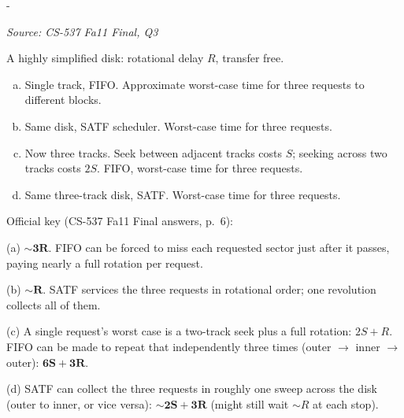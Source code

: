 \documentclass[11pt,a4paper]{article}
\makeatletter
\newcommand{\keepspace}[1]{\par\penalty-100\begingroup
  \setlength{\dimen@}{#1}\dimen@ii\pagegoal\advance\dimen@ii-\pagetotal
  \ifdim\dimen@>\dimen@ii\ifdim\dimen@ii>\z@\vfil\fi\break\fi\endgroup}
\newcounter{qn}[section]
\newenvironment{Qn}[4]{%
  \refstepcounter{qn}\keepspace{7\baselineskip}%
  \begin{tcolorbox}[qboxstyle, title={Q\thesection.\theqn\ \ [#1 \textbar\ #2]\ \ #4}]%
  {\footnotesize\color{g3}\textit{Source: #3}}\par\smallskip%
}{%
  \end{tcolorbox}%
}
\newenvironment{Sol}{%
  \begin{tcolorbox}[sboxstyle, title={Solution}]%
}{%
  \end{tcolorbox}\vspace{0.35em}%
}
\makeatother
\begin{document}
\begin{Qn}{Hard}{Lect 22}{CS-537 Fa11 Final, Q3}{FIFO versus SATF on a 1-track and a 3-track disk}
A highly simplified disk: rotational delay $R$, transfer free.
\begin{enumerate}[(a)]
\item Single track, FIFO. Approximate worst-case time for three requests
      to different blocks.
\item Same disk, SATF scheduler. Worst-case time for three requests.
\item Now three tracks. Seek between adjacent tracks costs $S$; seeking
      across two tracks costs $2S$. FIFO, worst-case time for three
      requests.
\item Same three-track disk, SATF. Worst-case time for three requests.
\end{enumerate}
\end{Qn}
\begin{Sol}
Official key (CS-537 Fa11 Final answers, p.~6):

(a) $\boldsymbol{\sim 3R}$. FIFO can be forced to miss each requested
sector just after it passes, paying nearly a full rotation per request.

(b) $\boldsymbol{\sim R}$. SATF services the three requests in
rotational order; one revolution collects all of them.

(c) A single request's worst case is a two-track seek plus a full
rotation: $2S+R$. FIFO can be made to repeat that independently three
times (outer $\to$ inner $\to$ outer): $\boldsymbol{6S+3R}$.

(d) SATF can collect the three requests in roughly one sweep across the
disk (outer to inner, or vice versa): $\boldsymbol{\sim 2S+3R}$
(might still wait $\sim R$ at each stop).
\end{Sol}
\end{document}
